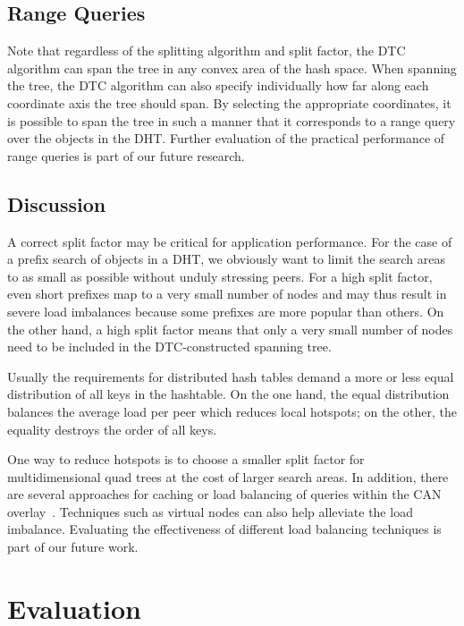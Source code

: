 \documentclass[fleqn,12pt,twoside]{article}
\begin{document}
\subsection{Range Queries}
\label{sec:range-queries}

Note that regardless of the splitting algorithm and split factor, the
DTC algorithm can span the tree in any convex area of the hash space.
When spanning the tree, the DTC algorithm can also specify
individually how far along each coordinate axis the tree should span.
By selecting the appropriate coordinates, it is possible to span the
tree in such a manner that it corresponds to a range query over the
objects in the DHT. Further evaluation of the practical performance of
range queries is part of our future research.


\subsection{Discussion}
\label{sec:discussion}


A correct split factor may be critical for application performance.
For the case of a prefix search of objects in a DHT, we obviously want
to limit the search areas to as small as possible without unduly
stressing peers. For a high split factor, even short prefixes map to a
very small number of nodes and may thus result in severe load
imbalances because some prefixes are more popular than others. On the
other hand, a high split factor means that only a very small number of
nodes need to be included in the DTC-constructed spanning tree.

Usually the requirements for distributed hash tables demand a more or
less equal distribution of all keys in the hashtable.  On the one
hand, the equal distribution balances the average load per peer which
reduces local hotspots; on the other, the equality destroys the
order of all keys.

One way to reduce hotspots is to choose a smaller split factor for
multidimensional quad trees at the cost of larger search areas. In
addition, there are several approaches for caching or load balancing of
queries within the CAN overlay~\cite{stading:ppc,rao2003lbs}.
Techniques such as virtual nodes\cite{StoicaI:Chord} can also help
alleviate the load imbalance. Evaluating the effectiveness of
different load balancing techniques is part of our future work.


\section{Evaluation}
\label{sec:evaluation}
\end{document}
